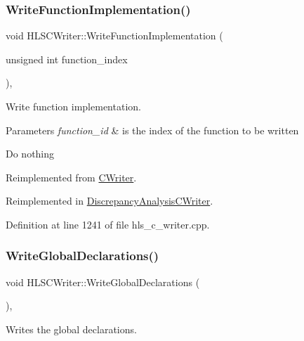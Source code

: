 \subsubsection{\texorpdfstring{Write\+Function\+Implementation()}{WriteFunctionImplementation()}}
{\footnotesize\ttfamily void H\+L\+S\+C\+Writer\+::\+Write\+Function\+Implementation (\begin{DoxyParamCaption}\item[{unsigned int}]{function\+\_\+index }\end{DoxyParamCaption})\hspace{0.3cm}{\ttfamily [protected]}, {\ttfamily [virtual]}}



Write function implementation. 


\begin{DoxyParams}{Parameters}
{\em function\+\_\+id} & is the index of the function to be written \\
\hline
\end{DoxyParams}
Do nothing 

Reimplemented from \hyperlink{classCWriter_a3a050cfd9987eb7a7227865cf40db91d}{C\+Writer}.



Reimplemented in \hyperlink{classDiscrepancyAnalysisCWriter_a544a8f99622f86cfbcc2eae9a83d4e64}{Discrepancy\+Analysis\+C\+Writer}.



Definition at line 1241 of file hls\+\_\+c\+\_\+writer.\+cpp.

\mbox{\label{classHLSCWriter_a6ea23b34e9d1bde20adbef400db94c6f}} 
\subsubsection{\texorpdfstring{Write\+Global\+Declarations()}{WriteGlobalDeclarations()}}
{\footnotesize\ttfamily void H\+L\+S\+C\+Writer\+::\+Write\+Global\+Declarations (\begin{DoxyParamCaption}{ }\end{DoxyParamCaption})\hspace{0.3cm}{\ttfamily [protected]}, {\ttfamily [virtual]}}



Writes the global declarations. 



